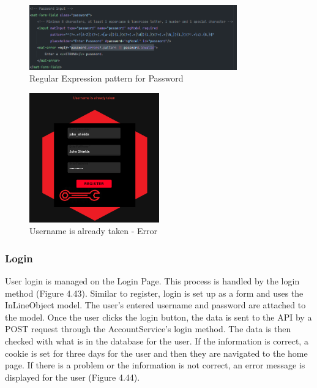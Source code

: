 \begin{figure}[H]
    \caption{Regular Expression pattern for Password}
    \label{image:passwordRegEx}
    \centering
    \includegraphics[width=0.8\textwidth]{images/repota/account_pages/password_regex.png}
\end{figure}

\begin{figure}[H]
    \caption{Username is already taken - Error}
    \label{image:nameTaken}
    \centering
    \includegraphics[width=0.5\textwidth]{images/repota/UI/username_taken.png}
\end{figure}

\subsubsection{Login}
User login is managed on the Login Page. This process is handled by the login method (Figure 4.43). Similar to register, login is set up as a form and uses the InLineObject model. The user's entered username and password are attached to the model. Once the user clicks the login button, the data is sent to the API by a POST request through the AccountService's login method. The data is then checked with what is in the database for the user. If the information is correct, a cookie is set for three days for the user and then they are navigated to the home page. If there is a problem or the information is not correct, an error message is displayed for the user (Figure 4.44). 

